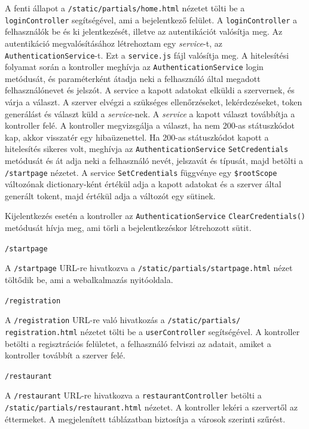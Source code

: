 A fenti állapot a \texttt{/static/partials/home.html} nézetet tölti be a \texttt{login\-Control\-ler} segítségével, ami a bejelentkező felület. A \texttt{loginController} a felhasználók be és ki jelentkezését, illetve az autentikációt valósítja meg. Az autentikáció megvalósításához létrehoztam egy \textit{service}-t, az \texttt{AuthenticationService}-t. Ezt a \texttt{service.js} fájl valósítja meg. A hitelesítési folyamat során a kontroller meghívja az \texttt{AuthenticationService} login metódusát, és paraméterként átadja neki a felhasználó által megadott felhasználónevet és jelszót. A service a kapott adatokat elküldi a szervernek, és várja a választ. A szerver elvégzi a szükséges ellenőrzéseket, lekérdezéseket, token generálást és választ küld a \textit{service}-nek. A \textit{service} a kapott választ továbbítja a kontroller felé. A kontroller megvizsgálja a választ, ha nem 200-as státuszkódot kap, akkor visszatér egy hibaüzenettel. Ha 200-as státuszkódot kapott a hitelesítés sikeres volt, meghívja az \texttt{AuthenticationService} \texttt{SetCredentials} metódusát és át adja neki a felhasználó nevét, jelszavát és típusát, majd betölti a \texttt{/startpage} nézetet. A service \texttt{SetCredentials} függvénye egy \texttt{\$rootScope} változónak dictionary-ként értékül adja a kapott adatokat és a szerver által generált tokent, majd értékül adja a változót egy sütinek.

Kijelentkezés esetén a kontroller az \texttt{AuthenticationService} \texttt{ClearCredentials()} metódusát hívja meg, ami törli a bejelentkezéskor létrehozott sütit.

\bigskip

\noindent \texttt{/startpage}

A \texttt{/startpage} URL-re hivatkozva a \texttt{/static/partials/startpage.html} nézet töltődik be, ami a webalkalmazás nyitóoldala.

\bigskip

\noindent \texttt{/registration}

A \texttt{/registration} URL-re való hivatkozás a \texttt{/static/partials/} \\ \texttt{registration.html} nézetet tölti be a \texttt{userController} segítségével. A kontroller betölti a regisztrációs felületet, a felhasználó felviszi az adatait, amiket a kontroller továbbít a szerver felé.

\bigskip

\noindent \texttt{/restaurant}

A \texttt{/restaurant} URL-re hivatkozva a \texttt{restaurantController} betölti a \\ \texttt{/static/partials/restaurant.html} nézetet. A kontroller lekéri a szervertől az éttermeket. A megjelenített táblázatban biztosítja a városok szerinti szűrést.

